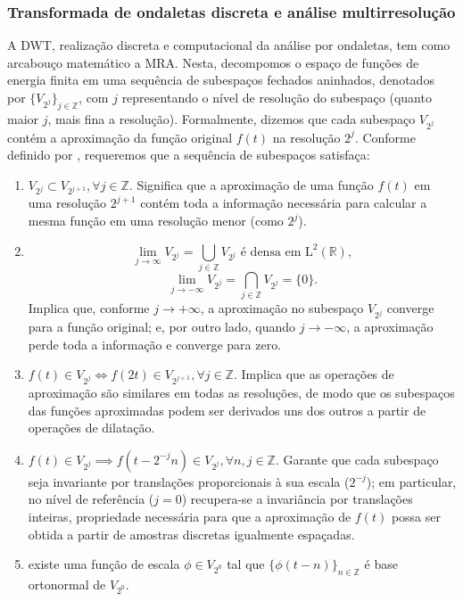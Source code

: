 \subsubsection{Transformada de ondaletas discreta e análise multirresolução}\label{sec-dwt-mra}

A DWT, realização discreta e computacional da análise por ondaletas, tem como arcabouço matemático a MRA.
Nesta, decompomos o espaço de funções de energia finita em uma sequência de subespaços fechados aninhados, denotados por \(\{V_{2^j}\}_{j \in \mathbb{Z}}\), com \(j\) representando o nível de resolução do subespaço (quanto maior \(j\), mais fina a resolução). 
Formalmente, dizemos que cada subespaço \(V_{2^j}\) contém a aproximação da função original \(f(t)\) na resolução \(2^j\). 
Conforme definido por , requeremos que a sequência de subespaços satisfaça:
\begin{enumerate}
    \item \(V_{2^j} \subset V_{2^{j+1}}, \forall j \in \mathbb{Z}\).
    Significa que a aproximação de uma função \(f(t)\) em uma resolução \(2^{j + 1}\) contém toda a informação necessária para calcular a mesma função em uma resolução menor (como \(2^{j}\)).

    \item \[
    	\lim_{j \rightarrow \infty} V_{2^j} = \bigcup_{j \in \mathbb{Z}} V_{2^j} \text{ é densa em } \mathrm{L}^2(\mathbb{R}),
    \]
    \[
    	\lim_{j \rightarrow -\infty} V_{2^j} = \bigcap_{j \in \mathbb{Z}} V_{2^j} = \{0\}.
    \]
    Implica que, conforme \(j \to +\infty\), a aproximação no subespaço \(V_{2^{j}}\) converge para a função original; e, por outro lado, quando \(j \to -\infty\), a aproximação perde toda a informação e converge para zero.

    \item \(f(t) \in V_{2^j} \iff f(2t) \in V_{2^{j + 1}}, \forall j \in \mathbb{Z}\).
    Implica que as operações de aproximação são similares em todas as resoluções, de modo que os subespaços das funções aproximadas podem ser derivados uns dos outros a partir de operações de dilatação.

    \item \(f(t) \in V_{2^j} \implies f(t - 2^{-j} n) \in V_{2^j}, \forall n, j \in \mathbb{Z}\).
    Garante que cada subespaço seja invariante por translações proporcionais à sua escala (\(2^{-j}\)); em particular, no nível de referência (\(j = 0\)) recupera-se a invariância por translações inteiras, propriedade necessária para que a aproximação de \(f(t)\) possa ser obtida a partir de amostras discretas igualmente espaçadas.

    \item existe uma função de escala \(\phi \in V_{2^0}\) tal que \(\{\phi(t - n)\}_{n \in \mathbb{Z}}\) é base ortonormal de \(V_{2^0}\).
\end{enumerate}

